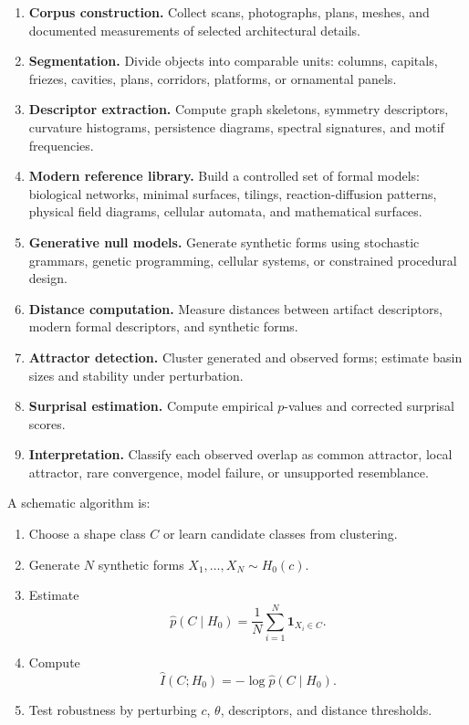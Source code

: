 \begin{enumerate}[label=\arabic*.]
    \item \textbf{Corpus construction.} Collect scans, photographs, plans, meshes, and documented measurements of selected architectural details.
    \item \textbf{Segmentation.} Divide objects into comparable units: columns, capitals, friezes, cavities, plans, corridors, platforms, or ornamental panels.
    \item \textbf{Descriptor extraction.} Compute graph skeletons, symmetry descriptors, curvature histograms, persistence diagrams, spectral signatures, and motif frequencies.
    \item \textbf{Modern reference library.} Build a controlled set of formal models: biological networks, minimal surfaces, tilings, reaction-diffusion patterns, physical field diagrams, cellular automata, and mathematical surfaces.
    \item \textbf{Generative null models.} Generate synthetic forms using stochastic grammars, genetic programming, cellular systems, or constrained procedural design.
    \item \textbf{Distance computation.} Measure distances between artifact descriptors, modern formal descriptors, and synthetic forms.
    \item \textbf{Attractor detection.} Cluster generated and observed forms; estimate basin sizes and stability under perturbation.
    \item \textbf{Surprisal estimation.} Compute empirical $p$-values and corrected surprisal scores.
    \item \textbf{Interpretation.} Classify each observed overlap as common attractor, local attractor, rare convergence, model failure, or unsupported resemblance.
\end{enumerate}

A schematic algorithm is:
\begin{enumerate}[label=\arabic*.]
    \item Choose a shape class $C$ or learn candidate classes from clustering.
    \item Generate $N$ synthetic forms $X_1,\dots,X_N\sim H_0(c)$.
    \item Estimate
    \begin{equation}
        \widehat{p}(C\mid H_0)=\frac{1}{N}\sum_{i=1}^{N}\mathbf{1}_{X_i\in C}.
    \end{equation}
    \item Compute
    \begin{equation}
        \widehat{I}(C;H_0)=-\log \widehat{p}(C\mid H_0).
    \end{equation}
    \item Test robustness by perturbing $c$, $\theta$, descriptors, and distance thresholds.
\end{enumerate}

